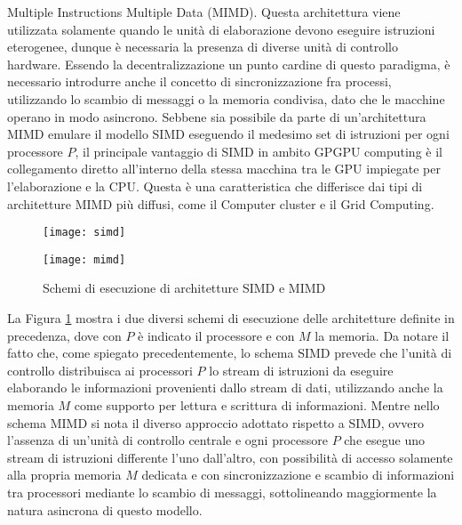 Multiple Instructions Multiple Data (MIMD)\cite{duncan1990survey}.
Questa architettura viene utilizzata solamente quando le unità di elaborazione
devono eseguire istruzioni eterogenee, dunque è necessaria la presenza
di diverse unità di controllo hardware.
Essendo la decentralizzazione un punto cardine
di questo paradigma, è necessario introdurre anche il concetto di
sincronizzazione fra processi, utilizzando lo scambio di messaggi o
la memoria condivisa, dato che le macchine operano in modo asincrono.
Sebbene sia possibile da parte di un'architettura MIMD emulare il modello
SIMD eseguendo il medesimo set di istruzioni per ogni processore $P$, il
principale vantaggio di SIMD in ambito GPGPU computing è il collegamento diretto
all'interno della stessa macchina tra le GPU impiegate per l'elaborazione e la 
CPU. Questa è una caratteristica che differisce dai tipi di
architetture MIMD più diffusi, come il Computer cluster e il Grid Computing.
\begin{figure}[t]
    \begin{minipage}[b]{.5\linewidth}
        \centering
        \texttt{[image: simd]}
    \end{minipage}
    \begin{minipage}[b]{.5\linewidth}
        \centering
        \texttt{[image: mimd]}
    \end{minipage}
    \caption{Schemi di esecuzione di architetture SIMD e MIMD}
    \label{fig:simd-mimd}
\end{figure}
La Figura \ref{fig:simd-mimd} mostra i due diversi schemi di esecuzione
delle architetture definite in precedenza, dove con $P$ è indicato il processore
e con $M$ la memoria. Da notare il fatto che, come spiegato precedentemente,
lo schema SIMD prevede che l'unità di controllo distribuisca ai processori $P$
lo stream di istruzioni da eseguire elaborando le informazioni
provenienti dallo stream di dati, utilizzando anche la memoria $M$ come supporto
per lettura e scrittura di informazioni. Mentre nello schema MIMD si nota
il diverso approccio adottato rispetto a SIMD, ovvero l'assenza di un'unità
di controllo centrale e ogni processore $P$ che esegue
uno stream di istruzioni differente l'uno dall'altro,
con possibilità di accesso solamente alla
propria memoria $M$ dedicata e con sincronizzazione e scambio di informazioni
tra processori mediante lo scambio di messaggi, sottolineando maggiormente
la natura asincrona di questo modello.
\\
